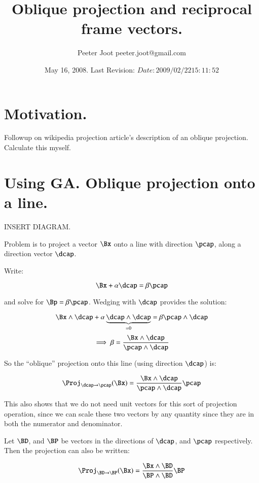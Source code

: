 \documentclass{article}      %
\title{ Oblique projection and reciprocal frame vectors. }
\author{Peeter Joot \quad peeter.joot@gmail.com}         %
\date{ May 16, 2008.  Last Revision: $Date: 2009/02/22 15:11:52 $ }
\begin{document}

\maketitle{}

\tableofcontents

\section{ Motivation. }

Followup on wikipedia projection article's description of an oblique
projection.  Calculate this myself.

\section{ Using GA.  Oblique projection onto a line. }

INSERT DIAGRAM.

Problem is to project a vector $\Bx$ onto a line with direction $\pcap$, along a direction vector $\dcap$.

Write:

\begin{equation}\label{eqn:solveForprojLineUnit}
\Bx + \alpha \dcap = \beta \pcap
\end{equation}

and solve for $\Bp = \beta \pcap$.  Wedging with $\dcap$ provides the solution:

\[
\Bx \wedge \dcap + \alpha \underbrace{\dcap \wedge \dcap}_{=0} = \beta \pcap \wedge \dcap
\]
\[
\implies
\beta = \frac{\Bx \wedge \dcap}{\pcap \wedge \dcap}
\]

So the ``oblique'' projection onto this line (using direction $\dcap$) is:

\begin{equation}
\Proj_{\dcap \rightarrow \pcap}(\Bx) =
\frac{\Bx \wedge \dcap}{\pcap \wedge \dcap} \pcap
\end{equation}

This also shows that we do not need unit vectors for this sort of projection
operation, since we can scale these two vectors by any quantity since they are
in both the numerator and denominator.

Let $\BD$, and $\BP$ be vectors in the directions of $\dcap$, and $\pcap$ respectively.  Then the projection can also be written:

\begin{equation}\label{eqn:obliqueGAproj}
\Proj_{\BD \rightarrow \BP}(\Bx) =
\frac{\Bx \wedge \BD}{\BP \wedge \BD} \BP
\end{equation}
\end{document}
